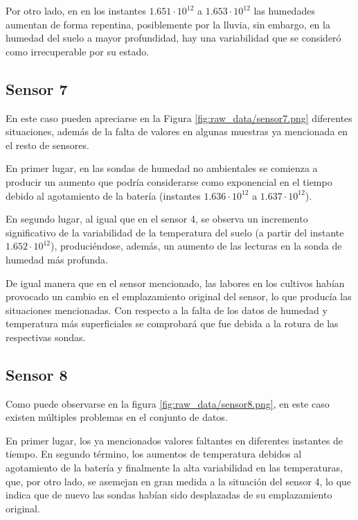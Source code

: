 Por otro lado, en en los instantes \(1.651 \cdot 10^{12}\) a \(1.653 \cdot 10^{12}\) las 
humedades aumentan de forma repentina, posiblemente por la lluvia, sin embargo, en la humedad 
del suelo a mayor profundidad, hay una variabilidad que se consideró como irrecuperable por su 
estado.

\newpage
\subsection{Sensor 7}


En este caso pueden apreciarse en la Figura \ref{fig:raw_data/sensor7.png} diferentes
situaciones, además de la falta de valores en algunas muestras ya mencionada en el 
resto de sensores.

En primer lugar, en las sondas de humedad no ambientales se comienza a producir un aumento que podría considerarse como exponencial en el tiempo debido al agotamiento de la batería (instantes \(1.636 \cdot 10^{12}\) a \(1.637 \cdot 10^{12}\)).

En segundo lugar, al igual que en el sensor 4, se observa un incremento significativo de la variabilidad
de la temperatura del suelo (a partir del instante \(1.652 \cdot 10^{12}\)), produciéndose, además, un aumento de las lecturas en la sonda de
humedad más profunda.

De igual manera que en el sensor mencionado, las labores en los cultivos habían provocado un
cambio en el emplazamiento original del sensor, lo que producía las situaciones mencionadas.
Con respecto a la falta de los datos de humedad y temperatura más superficiales se 
comprobará que fue debida a la rotura de las respectivas sondas.

\newpage
\subsection{Sensor 8}


Como puede observarse en la figura \ref{fig:raw_data/sensor8.png}, en este caso existen 
múltiples problemas en el conjunto de datos.

En primer lugar, los ya mencionados valores faltantes en diferentes instantes de tiempo.
En segundo término, los aumentos de temperatura debidos al agotamiento de la batería y finalmente
la alta variabilidad en las temperaturas, que, por otro lado, se asemejan en gran medida a la situación 
del sensor 4,
lo que indica que de nuevo las sondas habían sido desplazadas de su emplazamiento original.

